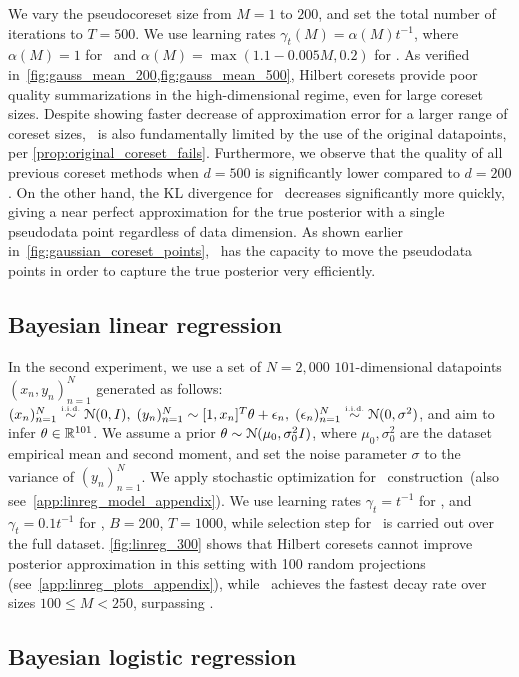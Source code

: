 %
We vary the pseudocoreset size from $M=1$ to $200$, and set the total number of
iterations to $ T =  500$. We use learning rates $ \gamma_t(M) = \alpha(M)
t^{-1}$, where  $ \alpha(M) = 1 $ for \sparsevi~and $ \alpha(M) = \max(1.1 - 0.005M, 0.2)
$ for \psvi.  As verified in~\cref{fig:gauss_mean_200,fig:gauss_mean_500},
Hilbert coresets provide poor quality summarizations in the high-dimensional
regime, even for large coreset sizes.  Despite showing faster decrease of
approximation error for a larger range of coreset sizes, \sparsevi~is also
fundamentally limited by the use of the original datapoints, per
\cref{prop:original_coreset_fails}.  Furthermore, we observe that the quality of all
previous coreset methods when $d=500$ is significantly lower
compared to $d=200$. On the other hand, the KL divergence for  \psvi~decreases
significantly more quickly, giving a near perfect approximation for the true
posterior with a single pseudodata point regardless of data dimension. As
shown earlier in~\cref{fig:gaussian_coreset_points}, \psvi~has the capacity to move the
pseudodata points in order to capture the
true posterior very efficiently. 

\subsection{Bayesian linear regression}
\label{section:linreg_experiment}
In the second experiment, we use a set of ${N=2,000}$ 
$101$-dimensional datapoints $(x_n,y_n)_{n=1}^{N}$ generated as follows: $(x_n)_{n=1}^N  \distiid \distNorm(0, I),\; (y_n)_{n=1}^N  \dist [1, x_n]^T\theta + \epsilon_n,\;  (\epsilon_n)_{n=1}^{N} \distiid \distNorm(0, \sigma^2)$, and aim to infer $\theta \in \mathbb{R}^{101}$. We assume a prior $\theta \sim \mathcal{N}(\mu_0,\sigma_0^2 I)$, where $ \mu_0, \sigma_0^2$ are the dataset empirical mean and second moment, and set the noise parameter $ \sigma$ to the variance of $(y_n)_{n=1}^{N}$. We apply stochastic optimization for \psvi~construction~(also see~\cref{app:linreg_model_appendix}). We use learning rates $\gamma_t = t^{-1}$ for \sparsevi, and $\gamma_t = 0.1t^{-1}$ for \psvi, $B=200$, $T=1000$, while selection step for \sparsevi~is carried out over the full dataset. \cref{fig:linreg_300} shows that Hilbert coresets cannot improve posterior approximation in this setting with 100 random projections (see~\cref{app:linreg_plots_appendix}), 
while \psvi~achieves the fastest decay rate over sizes $ 100 \leq M < 250$, surpassing \sparsevi.

\subsection{Bayesian logistic regression}
\label{section:logreg_experiment}

